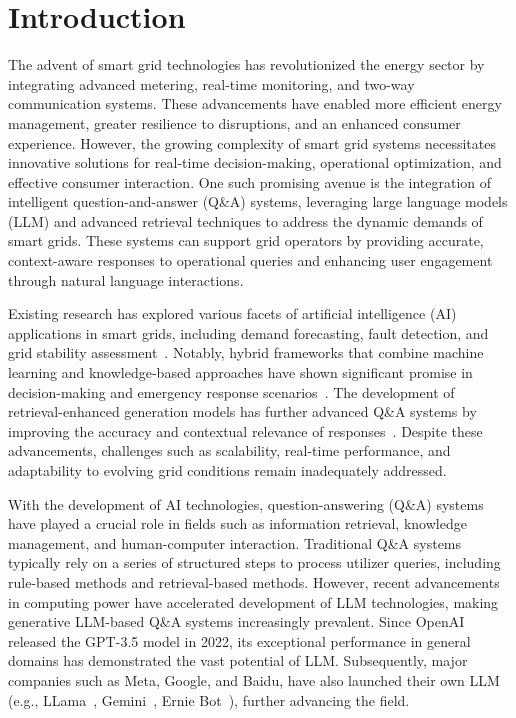 \section{Introduction}
The advent of smart grid technologies has revolutionized the energy sector by integrating advanced metering, real-time monitoring, and two-way communication systems. These advancements have enabled more efficient energy management, greater resilience to disruptions, and an enhanced consumer experience. However, the growing complexity of smart grid systems necessitates innovative solutions for real-time decision-making, operational optimization, and effective consumer interaction. One such promising avenue is the integration of intelligent question-and-answer (Q\&A) systems, leveraging large language models (LLM) and advanced retrieval techniques to address the dynamic demands of smart grids. These systems can support grid operators by providing accurate, context-aware responses to operational queries and enhancing user engagement through natural language interactions.

Existing research has explored various facets of artificial intelligence (AI) applications in smart grids, including demand forecasting, fault detection, and grid stability assessment~\cite{omitaomu2021ai}. Notably, hybrid frameworks that combine machine learning and knowledge-based approaches have shown significant promise in decision-making and emergency response scenarios~\cite{glukhikh2022cbr}. The development of retrieval-enhanced generation models has further advanced Q\&A systems by improving the accuracy and contextual relevance of responses~\cite{razzak2024deep}. Despite these advancements, challenges such as scalability, real-time performance, and adaptability to evolving grid conditions remain inadequately addressed.

With the development of AI technologies,
question-answering (Q\&A) systems have played a crucial role
in fields such as information retrieval, knowledge management,
and human-computer interaction. 
Traditional Q\&A systems typically rely on a series of structured steps to process utilizer queries, including rule-based methods and retrieval-based methods. However, recent advancements in computing power have accelerated development of LLM technologies, making generative LLM-based Q\&A systems increasingly prevalent. Since OpenAI released the GPT-3.5 model in 2022, its exceptional performance in general domains has demonstrated the vast potential of LLM. Subsequently, major companies such as Meta, Google, and Baidu, have also launched their own LLM (e.g., LLama~\cite{touvron2023llama}, Gemini~\cite{team2023gemini}, Ernie Bot~\cite{ren2023evaluation}), further advancing the field.





